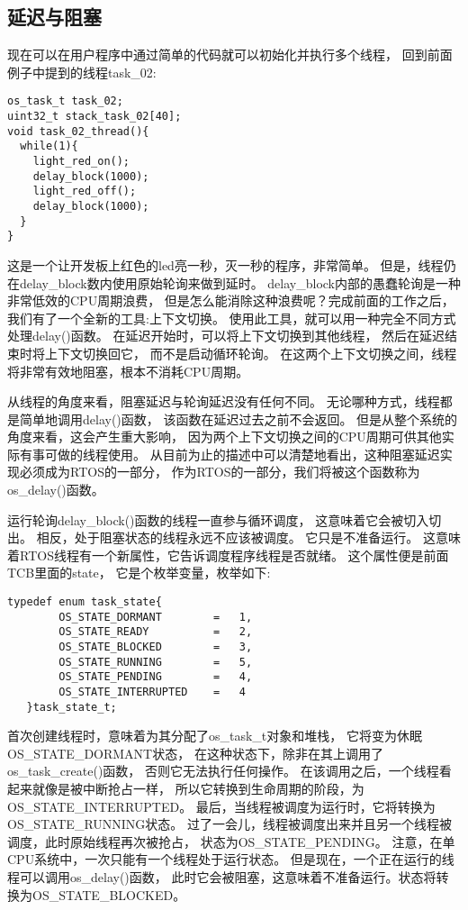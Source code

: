 \subsection{延迟与阻塞}
现在可以在用户程序中通过简单的代码就可以初始化并执行多个线程，
回到前面例子中提到的线程task\_02:
\begin{lstlisting}[language={[ANSI]C},keywordstyle=\color{blue!70},commentstyle=\color{red!50!green!50!blue!50},frame=shadowbox, rulesepcolor=\color{red!20!green!20!blue!20}]
os_task_t task_02;
uint32_t stack_task_02[40];
void task_02_thread(){
  while(1){
    light_red_on();
    delay_block(1000);
    light_red_off();
    delay_block(1000);
  }
}
\end{lstlisting}
这是一个让开发板上红色的led亮一秒，灭一秒的程序，非常简单。
但是，线程仍在delay\_block数内使用原始轮询来做到延时。
delay\_block内部的愚蠢轮询是一种非常低效的CPU周期浪费，
但是怎么能消除这种浪费呢？完成前面的工作之后，我们有了一个全新的工具:上下文切换。
使用此工具，就可以用一种完全不同方式处理delay()函数。
在延迟开始时，可以将上下文切换到其他线程，
然后在延迟结束时将上下文切换回它，
而不是启动循环轮询。
在这两个上下文切换之间，线程将非常有效地阻塞，根本不消耗CPU周期。

从线程的角度来看，阻塞延迟与轮询延迟没有任何不同。
无论哪种方式，线程都是简单地调用delay()函数，
该函数在延迟过去之前不会返回。
但是从整个系统的角度来看，这会产生重大影响，
因为两个上下文切换之间的CPU周期可供其他实际有事可做的线程使用。
从目前为止的描述中可以清楚地看出，这种阻塞延迟实现必须成为RTOS的一部分，
作为RTOS的一部分，我们将被这个函数称为os\_delay()函数。

运行轮询delay\_block()函数的线程一直参与循环调度，
这意味着它会被切入切出。
相反，处于阻塞状态的线程永远不应该被调度。 
它只是不准备运行。
这意味着RTOS线程有一个新属性，它告诉调度程序线程是否就绪。
这个属性便是前面TCB里面的state，
它是个枚举变量，枚举如下:
\begin{lstlisting}[language={[ANSI]C},keywordstyle=\color{blue!70},commentstyle=\color{red!50!green!50!blue!50},frame=shadowbox, rulesepcolor=\color{red!20!green!20!blue!20}]
    typedef	enum task_state{
        OS_STATE_DORMANT 		=	1,
        OS_STATE_READY 			= 	2,
        OS_STATE_BLOCKED 		= 	3,
        OS_STATE_RUNNING 		= 	5,
        OS_STATE_PENDING 		= 	4,
        OS_STATE_INTERRUPTED 	= 	4
   }task_state_t;
\end{lstlisting}

首次创建线程时，意味着为其分配了os\_task\_t对象和堆栈，
它将变为休眠OS\_STATE\_DORMANT状态，
在这种状态下，除非在其上调用了os\_task\_create()函数，
否则它无法执行任何操作。
在该调用之后，一个线程看起来就像是被中断抢占一样，
所以它转换到生命周期的阶段，为OS\_STATE\_INTERRUPTED。
最后，当线程被调度为运行时，它将转换为OS\_STATE\_RUNNING状态。
过了一会儿，线程被调度出来并且另一个线程被调度，此时原始线程再次被抢占，
状态为OS\_STATE\_PENDING。
注意，在单CPU系统中，一次只能有一个线程处于运行状态。
但是现在，一个正在运行的线程可以调用os\_delay()函数，
此时它会被阻塞，这意味着不准备运行。状态将转换为OS\_STATE\_BLOCKED。

